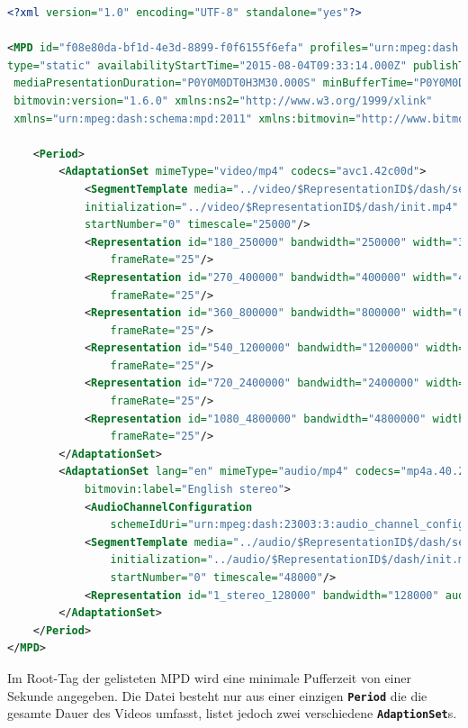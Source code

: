 \documentclass[paper = a4, fontsize = 12pt, parskip = half]{scrartcl} %
\def\elem#1{\texttt{\textbf{#1}}}
\begin{document}
\begin{lstlisting}[language=XML,basicstyle=\tiny]
<?xml version="1.0" encoding="UTF-8" standalone="yes"?>

<MPD id="f08e80da-bf1d-4e3d-8899-f0f6155f6efa" profiles="urn:mpeg:dash:profile:isoff-main:2011"
type="static" availabilityStartTime="2015-08-04T09:33:14.000Z" publishTime="2015-08-04T10:47:32.000Z"
 mediaPresentationDuration="P0Y0M0DT0H3M30.000S" minBufferTime="P0Y0M0DT0H0M1.000S" 
 bitmovin:version="1.6.0" xmlns:ns2="http://www.w3.org/1999/xlink" 
 xmlns="urn:mpeg:dash:schema:mpd:2011" xmlns:bitmovin="http://www.bitmovin.net/mpd/2015">

    <Period>
        <AdaptationSet mimeType="video/mp4" codecs="avc1.42c00d">
            <SegmentTemplate media="../video/$RepresentationID$/dash/segment_$Number$.m4s" 
            initialization="../video/$RepresentationID$/dash/init.mp4" duration="100000" 
            startNumber="0" timescale="25000"/>
            <Representation id="180_250000" bandwidth="250000" width="320" height="180" 
                frameRate="25"/>
            <Representation id="270_400000" bandwidth="400000" width="480" height="270"  
                frameRate="25"/>
            <Representation id="360_800000" bandwidth="800000" width="640" height="360" 
                frameRate="25"/>
            <Representation id="540_1200000" bandwidth="1200000" width="960" height="540"  
                frameRate="25"/>
            <Representation id="720_2400000" bandwidth="2400000" width="1280" height="720"  
                frameRate="25"/>
            <Representation id="1080_4800000" bandwidth="4800000" width="1920" height="1080" 
                frameRate="25"/>
        </AdaptationSet>
        <AdaptationSet lang="en" mimeType="audio/mp4" codecs="mp4a.40.2" 
			bitmovin:label="English stereo">
            <AudioChannelConfiguration 
                schemeIdUri="urn:mpeg:dash:23003:3:audio_channel_configuration:2011" value="2"/>
            <SegmentTemplate media="../audio/$RepresentationID$/dash/segment_$Number$.m4s" 
                initialization="../audio/$RepresentationID$/dash/init.mp4" duration="191472" 
                startNumber="0" timescale="48000"/>
            <Representation id="1_stereo_128000" bandwidth="128000" audioSamplingRate="48000"/>
        </AdaptationSet>
    </Period>
</MPD>
\end{lstlisting}

Im Root-Tag der gelisteten MPD wird eine minimale Pufferzeit von einer Sekunde angegeben. Die Datei besteht nur aus einer einzigen \elem{Period} die die gesamte Dauer des Videos umfasst, listet jedoch zwei verschiedene \elem{AdaptionSet}s. 
\end{document}
